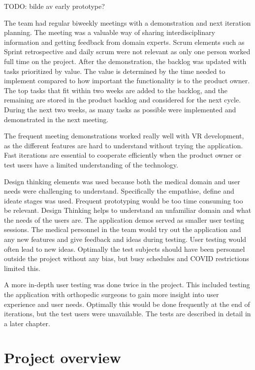 \documentclass[a4paper]{report}
\begin{document}
TODO: bilde av early prototype?

The team had regular biweekly meetings with a demonstration and next iteration planning. The meeting was a valuable way of sharing interdisciplinary information and getting feedback from domain experts. Scrum elements such as Sprint retrospective and daily scrum were not relevant as only one person worked full time on the project.
After the demonstration, the backlog was updated with tasks prioritized by value. The value is determined by the time needed to implement compared to how important the functionality is to the product owner. The top tasks that fit within two weeks are added to the backlog, and the remaining are stored in the product backlog and considered for the next cycle.
During the next two weeks, as many tasks as possible were implemented and demonstrated in the next meeting.

The frequent meeting demonstrations worked really well with VR development, as the different features are hard to understand without trying the application. Fast iterations are essential to cooperate efficiently when the product owner or test users have a limited understanding of the technology.

Design thinking elements was used because both the medical domain and user needs were challenging to understand. Specifically the empathise, define and ideate stages was used. Frequent prototyping would be too time consuming too be relevant. Design Thinking helps to understand an unfamiliar domain and what the needs of the users are.
The application demos served as smaller user testing sessions. The medical personnel in the team would try out the application and any new features and give feedback and ideas during testing. User testing would often lead to new ideas. Optimally the test subjects should have been personnel outside the project without any bias, but busy schedules and COVID restrictions limited this.

A more in-depth user testing was done twice in the project. This included testing the application with orthopedic surgeons to gain more insight into user experience and user needs. Optimally this would be done frequently at the end of iterations, but the test users were unavailable. The tests are described in detail in a later chapter.

\section{Project overview}\label{CodeStructure}
\end{document}
